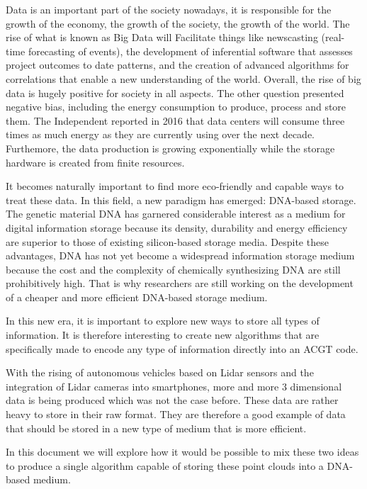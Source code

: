 
Data is an important part of the society nowadays, it is responsible for the growth of the economy, the growth of the society, the growth of the world. 
The rise of what is known as Big Data will Facilitate things like newscasting (real-time forecasting of events), the development of inferential software that assesses project outcomes to date patterns, and the creation of advanced algorithms for correlations that enable a new understanding of the world.
Overall, the rise of big data is hugely positive for society in all aspects. The other question presented negative bias, including the energy consumption to produce, process and store them.
The Independent reported in 2016 that data centers will consume three times as much energy as they are currently using over the next decade. \cite{bib:data_storage_impact}
Furthemore, the data production is growing exponentially while the storage hardware is created from finite resources.

It becomes naturally important to find more eco-friendly and capable ways to treat these data. 
In this field, a new paradigm has emerged: DNA-based storage.
The genetic material DNA has garnered considerable interest as a medium for digital information storage because its density, durability and energy efficiency are superior to those of existing silicon-based storage media.  
Despite these advantages, DNA has not yet become a widespread information storage medium because the cost and the complexity of chemically synthesizing DNA are still prohibitively high. 
That is why researchers are still working on the development of a cheaper and more efficient DNA-based storage medium.

In this new era, it is important to explore new ways to store all types of information. 
It is therefore interesting to create new algorithms that are specifically made to encode any type of information directly into an ACGT code. 

With the rising of autonomous vehicles based on Lidar sensors and the integration of Lidar cameras into smartphones, more and more $3$ dimensional data is being produced which was not the case before. These data are rather heavy to store in their raw format.
They are therefore a good example of data that should be stored in a new type of medium that is more efficient. 

In this document we will explore how it would be possible to mix these two ideas to produce a single algorithm capable of storing these point clouds into a DNA-based medium.
